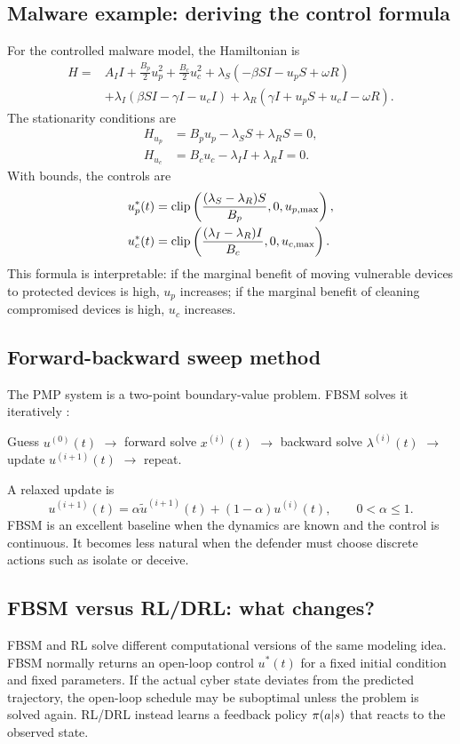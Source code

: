 \documentclass[11pt,a4paper]{article}
\begin{document}
\subsection{Malware example: deriving the control formula}
For the controlled malware model, the Hamiltonian is
\begin{align}
H=&A_I I+\frac{B_p}{2}u_p^2+\frac{B_c}{2}u_c^2
+\lambda_S(-\beta SI-u_pS+\omega R)\nonumber\\
&+\lambda_I(\beta SI-\gamma I-u_cI)
+\lambda_R(\gamma I+u_pS+u_cI-\omega R).
\end{align}
The stationarity conditions are
\begin{align}
H_{u_p}&=B_pu_p-\lambda_SS+\lambda_RS=0,\\
H_{u_c}&=B_cu_c-\lambda_II+\lambda_RI=0.
\end{align}
With bounds, the controls are
\begin{align}
u_p^*(t)&=\operatorname{clip}\left(\frac{(\lambda_S-\lambda_R)S}{B_p},0,u_{p,\max}\right),\\
u_c^*(t)&=\operatorname{clip}\left(\frac{(\lambda_I-\lambda_R)I}{B_c},0,u_{c,\max}\right).
\end{align}
This formula is interpretable: if the marginal benefit of moving vulnerable devices to protected devices is high, $u_p$ increases; if the marginal benefit of cleaning compromised devices is high, $u_c$ increases.

\subsection{Forward-backward sweep method}
The PMP system is a two-point boundary-value problem. FBSM solves it iteratively \cite{mcasey2012}:
\begin{flowbox}
Guess $u^{(0)}(t)$ $\rightarrow$ forward solve $x^{(i)}(t)$ $\rightarrow$ backward solve $\lambda^{(i)}(t)$ $\rightarrow$ update $u^{(i+1)}(t)$ $\rightarrow$ repeat.
\end{flowbox}
A relaxed update is
\begin{equation}
u^{(i+1)}(t)=\alpha \tilde{u}^{(i+1)}(t)+(1-\alpha)u^{(i)}(t),\qquad 0<\alpha\leq1.
\end{equation}
FBSM is an excellent baseline when the dynamics are known and the control is continuous. It becomes less natural when the defender must choose discrete actions such as isolate or deceive.



\subsection{FBSM versus RL/DRL: what changes?}
FBSM and RL solve different computational versions of the same modeling idea. FBSM normally returns an open-loop control $u^*(t)$ for a fixed initial condition and fixed parameters. If the actual cyber state deviates from the predicted trajectory, the open-loop schedule may be suboptimal unless the problem is solved again. RL/DRL instead learns a feedback policy $\pi(a|s)$ that reacts to the observed state.
\end{document}
